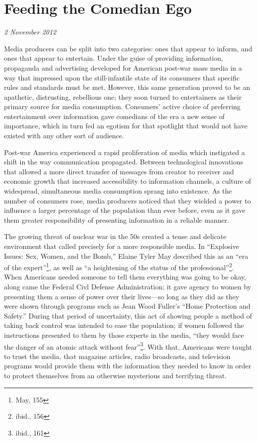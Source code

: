 \section{Feeding the Comedian Ego}

\textit{2 November 2012}

Media producers can be split into two categories: ones that appear to inform,
and ones that appear to entertain. Under the guise of providing information,
propaganda and advertising developed for American post-war mass media in a way
that impressed upon the still-infantile state of its consumers that specific
rules and standards must be met. However, this same generation proved to be an
apathetic, distrusting, rebellious one; they soon turned to entertainers as
their primary source for media consumption. Consumers' active choice of
preferring entertainment over information gave comedians of the era a new sense
of importance, which in turn fed an egotism for that spotlight that would not
have existed with any other sort of audience.

Post-war America experienced a rapid proliferation of media which instigated a
shift in the way communication propagated. Between technological innovations
that allowed a more direct transfer of messages from creator to receiver and
economic growth that increased accessibility to information channels, a culture
of widespread, simultaneous media consumption sprang into existence. As the
number of consumers rose, media producers noticed that they wielded a power to
influence a larger percentage of the population than ever before, even as it
gave them greater responsibility of presenting information in a reliable manner.

The growing threat of nuclear war in the 50s created a tense and delicate
environment that called precisely for a more responsible media. In ``Explosive
Issues: Sex, Women, and the Bomb,'' Elaine Tyler May described this as an ``era of
the expert''\footnote{May, 155}, as well as ``a heightening of the status of the
professional''\footnote{ibid., 156}. When Americans needed someone to tell them
everything was going to be okay, along came the Federal Civl Defense
Administration; it gave agency to women by presenting them a sense of power over
their lives—so long as they did as they were shown through programs such as Jean
Wood Fuller's ``Home Protection and Safety.'' During that period of uncertainty,
this act of showing people a method of taking back control was intended to ease
the population; if women followed the instructions presented to them by those
experts in the media, ``they would face the danger of an atomic attack without
fear''\footnote{ibid., 161}. With that, Americans were taught to trust the
media, that magazine articles, radio broadcasts, and television programs would
provide them with the information they needed to know in order to protect
themselves from an otherwise mysterious and terrifying threat.

